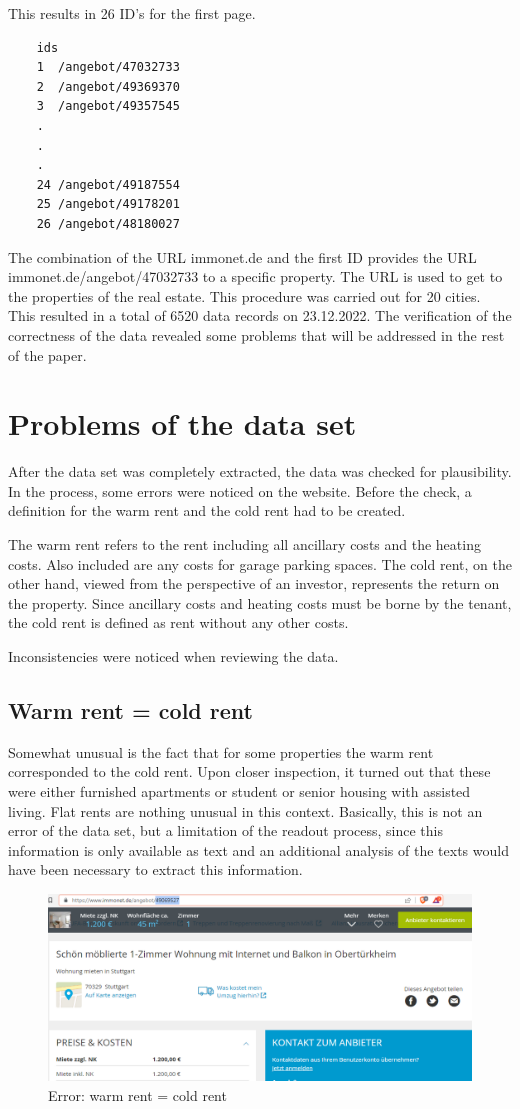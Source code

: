 This results in 26 ID's for the first page.
\begin{verbatim}
	ids
	1  /angebot/47032733
	2  /angebot/49369370
	3  /angebot/49357545
	.
	.
	.
	24 /angebot/49187554
	25 /angebot/49178201
	26 /angebot/48180027
\end{verbatim}

The combination of the URL immonet.de and the first ID provides the URL immonet.de/angebot/47032733 to a specific property. The URL is used to get to the properties of the real estate. This procedure was carried out for 20 cities. This resulted in a total of 6520 data records on 23.12.2022. The verification of the correctness of the data revealed some problems that will be addressed in the rest of the paper.


\section{Problems of the data set}

After the data set was completely extracted, the data was checked for plausibility. In the process, some errors were noticed on the website. Before the check, a definition for the warm rent and the cold rent had to be created.

The warm rent refers to the rent including all ancillary costs and the heating costs. Also included are any costs for garage parking spaces. The cold rent, on the other hand, viewed from the perspective of an investor, represents the return on the property. Since ancillary costs and heating costs must be borne by the tenant, the cold rent is defined as rent without any other costs.

Inconsistencies were noticed when reviewing the data.

\subsection{Warm rent = cold rent}
Somewhat unusual is the fact that for some properties the warm rent corresponded to the cold rent. Upon closer inspection, it turned out that these were either furnished apartments or student or senior housing with assisted living. Flat rents are nothing unusual in this context. Basically, this is not an error of the data set, but a limitation of the readout process, since this information is only available as text and an additional analysis of the texts would have been necessary to extract this information. 

\begin{figure}[H]
	\centering
	\includegraphics[width=0.7\linewidth]{img/49069527}
	\caption{Error: warm rent = cold rent}
	\label{fig:49069527}
\end{figure}

